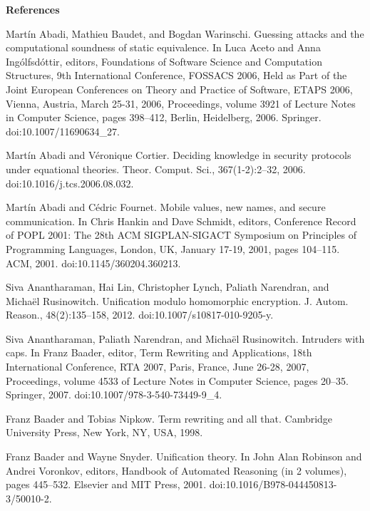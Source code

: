 
 
\par\medskip\noindent\textbf{References}\par
  
\par\noindent  [1]  Martín Abadi, Mathieu Baudet, and Bogdan Warinschi.  Guessing attacks and the computational soundness of static equivalence.  In Luca Aceto and Anna Ingólfsdóttir, editors, Foundations of Software Science and Computation Structures, 9th International Conference, FOSSACS 2006, Held as Part of the Joint European Conferences on Theory and Practice of Software, ETAPS 2006, Vienna, Austria, March 25-31, 2006, Proceedings, volume 3921 of Lecture Notes in Computer Science, pages 398–412, Berlin, Heidelberg, 2006. Springer.  doi:10.1007/11690634\_27.  
 
\par\noindent  [2]  Martín Abadi and Véronique Cortier.  Deciding knowledge in security protocols under equational theories.  Theor. Comput. Sci., 367(1-2):2–32, 2006.  doi:10.1016/j.tcs.2006.08.032.  
 
\par\noindent  [3]  Martín Abadi and Cédric Fournet.  Mobile values, new names, and secure communication.  In Chris Hankin and Dave Schmidt, editors, Conference Record of POPL 2001: The 28th ACM SIGPLAN-SIGACT Symposium on Principles of Programming Languages, London, UK, January 17-19, 2001, pages 104–115. ACM, 2001.  doi:10.1145/360204.360213.  
 
\par\noindent  [4]  Siva Anantharaman, Hai Lin, Christopher Lynch, Paliath Narendran, and Michaël Rusinowitch.  Unification modulo homomorphic encryption.  J. Autom. Reason., 48(2):135–158, 2012.  doi:10.1007/s10817-010-9205-y.  
 
\par\noindent  [5]  Siva Anantharaman, Paliath Narendran, and Michaël Rusinowitch.  Intruders with caps.  In Franz Baader, editor, Term Rewriting and Applications, 18th International Conference, RTA 2007, Paris, France, June 26-28, 2007, Proceedings, volume 4533 of Lecture Notes in Computer Science, pages 20–35. Springer, 2007.  doi:10.1007/978-3-540-73449-9\_4.  
 
\par\noindent  [6]  Franz Baader and Tobias Nipkow.  Term rewriting and all that.  Cambridge University Press, New York, NY, USA, 1998.  
 
\par\noindent  [7]  Franz Baader and Wayne Snyder.  Unification theory.  In John Alan Robinson and Andrei Voronkov, editors, Handbook of Automated Reasoning (in 2 volumes), pages 445–532. Elsevier and MIT Press, 2001.  doi:10.1016/B978-044450813-3/50010-2.  
 
